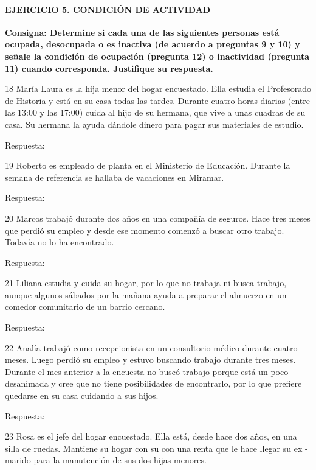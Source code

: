 \documentclass[
  openany]{book}
\begin{document}
\hypertarget{ejercicio-5.-condiciuxf3n-de-actividad}{%
\paragraph{\texorpdfstring{\textbf{EJERCICIO 5. CONDICIÓN DE ACTIVIDAD}}{EJERCICIO 5. CONDICIÓN DE ACTIVIDAD}}\label{ejercicio-5.-condiciuxf3n-de-actividad}}

\textbf{Consigna: Determine si cada una de las siguientes personas está ocupada, desocupada o es inactiva (de acuerdo a preguntas 9 y 10) y señale la condición de ocupación (pregunta 12) o inactividad (pregunta 11) cuando corresponda. Justifique su respuesta.}

18 María Laura es la hija menor del hogar encuestado. Ella estudia el Profesorado de Historia y está en su casa todas las tardes. Durante cuatro horas diarias (entre las 13:00 y las 17:00) cuida al hijo de su hermana, que vive a unas cuadras de su casa. Su hermana la ayuda dándole dinero para pagar sus materiales de estudio.

Respuesta:

19 Roberto es empleado de planta en el Ministerio de Educación. Durante la semana de referencia se hallaba de vacaciones en Miramar.

Respuesta:

20 Marcos trabajó durante dos años en una compañía de seguros. Hace tres meses que perdió su empleo y desde ese momento comenzó a buscar otro trabajo. Todavía no lo ha encontrado.

Respuesta:

21 Liliana estudia y cuida su hogar, por lo que no trabaja ni busca trabajo, aunque algunos sábados por la mañana ayuda a preparar el almuerzo en un comedor comunitario de un barrio cercano.

Respuesta:

22 Analía trabajó como recepcionista en un consultorio médico durante cuatro meses. Luego perdió su empleo y estuvo buscando trabajo durante tres meses. Durante el mes anterior a la encuesta no buscó trabajo porque está un poco desanimada y cree que no tiene posibilidades de encontrarlo, por lo que prefiere quedarse en su casa cuidando a sus hijos.

Respuesta:

23 Rosa es el jefe del hogar encuestado. Ella está, desde hace dos años, en una silla de ruedas. Mantiene su hogar con su con una renta que le hace llegar su ex - marido para la manutención de sus dos hijas menores.
\end{document}
